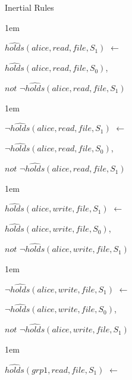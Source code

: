 \documentclass[global,twocolumn,final]{svjour}
\newenvironment{vquote}
  {\begin{list}{}{\leftmargin 1em}\item[]}
  {\end{list}}
\begin{document}
\begin{enumerate}
       \item
         Inertial Rules

         \begin{vquote}
           $\hat{holds}(alice, read, file, S_{1})$ $\leftarrow$

           \hspace{1em}
           $\hat{holds}(alice, read, file, S_{0})$,

           \hspace{1em}
           $not$ $\lnot\hat{holds}(alice, read, file, S_{1})$
         \end{vquote}

         \begin{vquote}
           $\lnot\hat{holds}(alice, read, file, S_{1})$ $\leftarrow$

           \hspace{1em}
           $\lnot\hat{holds}(alice, read, file, S_{0})$,

           \hspace{1em}
           $not$ $\lnot\hat{holds}(alice, read, file, S_{1})$
         \end{vquote}

         \begin{vquote}
           $\hat{holds}(alice, write, file, S_{1})$ $\leftarrow$

           \hspace{1em}
           $\hat{holds}(alice, write, file, S_{0})$,

           \hspace{1em}
           $not$ $\lnot\hat{holds}(alice, write, file, S_{1})$
         \end{vquote}

         \begin{vquote}
           $\lnot\hat{holds}(alice, write, file, S_{1})$ $\leftarrow$

           \hspace{1em}
           $\lnot\hat{holds}(alice, write, file, S_{0})$,

           \hspace{1em}
           $not$ $\lnot\hat{holds}(alice, write, file, S_{1})$
         \end{vquote}

         \begin{vquote}
           $\hat{holds}(grp1, read, file, S_{1})$ $\leftarrow$


\end{vquote}
\end{enumerate}
\end{document}
